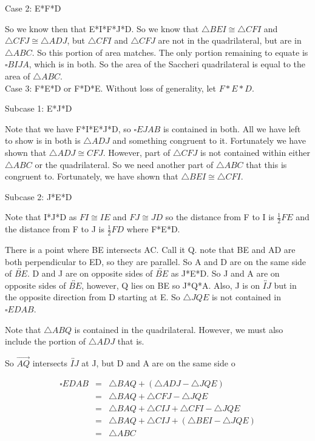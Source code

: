 \documentclass[12pt,letterpaper]{article}
\begin{document}
Case 2: E*F*D

So we know then that E*I*F*J*D.  So we know that $\triangle BEI\cong \triangle CFI$ and $\triangle CFJ \cong \triangle ADJ$, but $\triangle CFI$ and $\triangle CFJ$ are not in the quadrilateral, but are in $\triangle ABC$.  So this portion of area matches.  The only portion remaining to equate is $\square BIJA$, which is in both.  So the area of the Saccheri quadrilateral is equal to the area of $\triangle ABC$.\\


Case 3: F*E*D or F*D*E.  Without loss of generality, let $F*E*D$.

Subcase 1: E*J*D

Note that we have F*I*E*J*D, so $\square EJAB$ is contained in both. All we have left to show is in both is $\triangle ADJ$ and something congruent to it.  Fortunately we have shown that $\triangle ADJ \cong CFJ$.  However, part of $\triangle CFJ$ is not contained within either $\triangle ABC$ or the quadrilateral.  So we need another part of $\triangle ABC$ that this is congruent to. Fortunately, we have shown that $\triangle BEI \cong \triangle CFI$. 

Subcase 2: J*E*D

Note that I*J*D as $FI\cong IE$ and $FJ \cong JD$ so the distance from F to I is $\frac{1}{2}FE$ and the distance from F to J is $\frac{1}{2}FD$ where F*E*D.

There is a point where BE intersects AC.  Call it Q. note that BE and AD are both perpendicular to ED, so they are parallel.  So A and D are on the same side of $\overleftrightarrow{BE}$.  D and J are on opposite sides of $\overleftrightarrow{BE}$ as J*E*D. So J and A are on opposite sides of $\overleftrightarrow{BE}$, however, Q lies on BE so J*Q*A.  Also, J is on $\overleftrightarrow{IJ}$ but in the opposite direction from D starting at E.  So $\triangle JQE$ is not contained in $\square EDAB$. 

Note that $\triangle ABQ$ is contained in the quadrilateral.  However, we must also include the portion of $\triangle ADJ$ that is.



So $\overrightarrow{AQ}$ intersects $\overleftrightarrow{IJ}$ at J, but D and A are on the same side o

\begin{eqnarray*}
\square EDAB &=& \triangle BAQ + (\triangle ADJ - \triangle JQE)\\
&=& \triangle BAQ + \triangle CFJ - \triangle JQE\\
&=& \triangle BAQ + \triangle CIJ + \triangle CFI - \triangle JQE\\
&=& \triangle BAQ + \triangle CIJ + (\triangle BEI - \triangle JQE)\\
&=& \triangle ABC
\end{eqnarray*}
\end{document}
